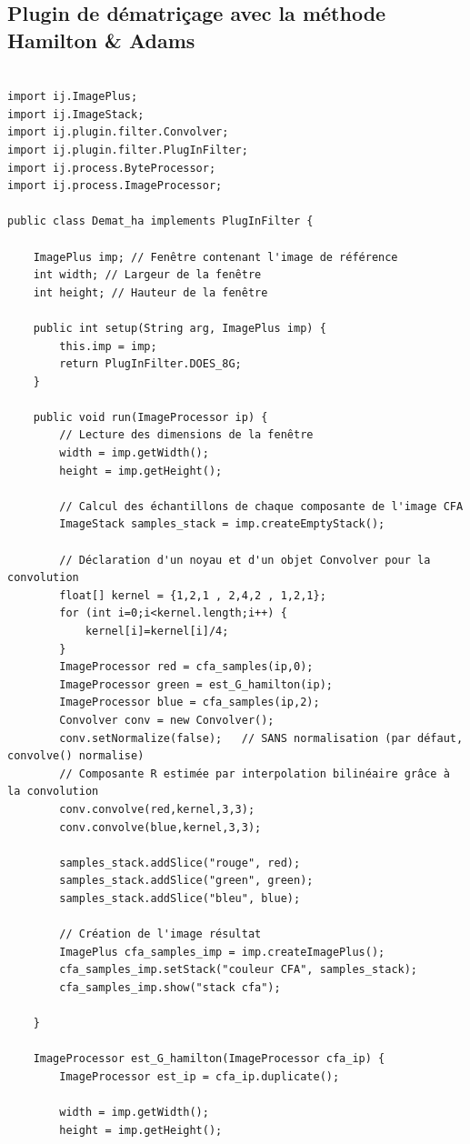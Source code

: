 \documentclass[a4paper,11pt]{article}
\begin{document}
  
  \subsection{Plugin de dématriçage avec la méthode Hamilton \& Adams}
  
  \begin{lstlisting}[caption=Code de la troisième partie du TP]
   
import ij.ImagePlus;
import ij.ImageStack;
import ij.plugin.filter.Convolver;
import ij.plugin.filter.PlugInFilter;
import ij.process.ByteProcessor;
import ij.process.ImageProcessor;

public class Demat_ha implements PlugInFilter {

	ImagePlus imp; // Fenêtre contenant l'image de référence
	int width; // Largeur de la fenêtre
	int height; // Hauteur de la fenêtre

	public int setup(String arg, ImagePlus imp) {
		this.imp = imp;
		return PlugInFilter.DOES_8G;
	}

	public void run(ImageProcessor ip) {
		// Lecture des dimensions de la fenêtre
		width = imp.getWidth();
		height = imp.getHeight();
		
		// Calcul des échantillons de chaque composante de l'image CFA
		ImageStack samples_stack = imp.createEmptyStack();
		
		// Déclaration d'un noyau et d'un objet Convolver pour la convolution
		float[] kernel = {1,2,1 , 2,4,2 , 1,2,1};
		for (int i=0;i<kernel.length;i++) {
		    kernel[i]=kernel[i]/4;
		}
		ImageProcessor red = cfa_samples(ip,0);
		ImageProcessor green = est_G_hamilton(ip);
		ImageProcessor blue = cfa_samples(ip,2);
		Convolver conv = new Convolver();
		conv.setNormalize(false);	// SANS normalisation (par défaut, convolve() normalise)
		// Composante R estimée par interpolation bilinéaire grâce à la convolution
		conv.convolve(red,kernel,3,3);
		conv.convolve(blue,kernel,3,3);
		
		samples_stack.addSlice("rouge", red);
		samples_stack.addSlice("green", green);
		samples_stack.addSlice("bleu", blue);

		// Création de l'image résultat
		ImagePlus cfa_samples_imp = imp.createImagePlus();
		cfa_samples_imp.setStack("couleur CFA", samples_stack);
		cfa_samples_imp.show("stack cfa");

	}
	
	ImageProcessor est_G_hamilton(ImageProcessor cfa_ip) {
		ImageProcessor est_ip = cfa_ip.duplicate();
		
		width = imp.getWidth();
		height = imp.getHeight();


\end{lstlisting}
\end{document}
